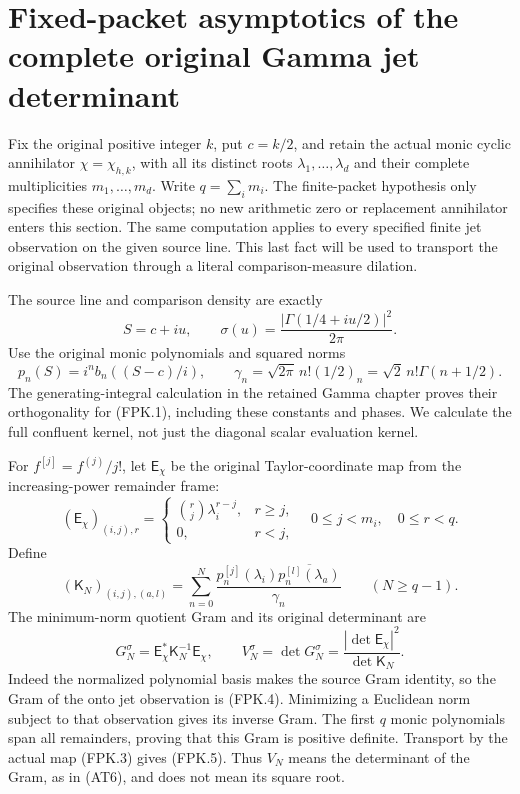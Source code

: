 \section{Fixed-packet asymptotics of the complete original Gamma jet determinant}
\label{sec:fixed-gamma-full-jet}

Fix the original positive integer $k$, put $c=k/2$, and retain the
actual monic cyclic annihilator $\chi=\chi_{h,k}$, with all its
distinct roots $\lambda_1,\ldots,\lambda_d$ and their complete
multiplicities $m_1,\ldots,m_d$. Write $q=\sum_i m_i$.
The finite-packet hypothesis only specifies these original objects;
no new arithmetic zero or replacement annihilator enters this section.
The same computation applies to every specified finite jet observation
on the given source line. This last fact will be used to transport the
original observation through a literal comparison-measure dilation.

The source line and comparison density are exactly
\[
 S=c+iu,\qquad
 \sigma(u)=\frac{|\Gamma(1/4+iu/2)|^2}{2\pi}.
 \tag{FPK.1}
\]
Use the original monic polynomials and squared norms
\[
 p_n(S)=i^n b_n((S-c)/i),\qquad
 \gamma_n=\sqrt{2\pi}\,n!(1/2)_n
          =\sqrt2\,n!\Gamma(n+1/2).
 \tag{FPK.2}
\]
The generating-integral calculation in the retained Gamma chapter proves
their orthogonality for (FPK.1), including these constants and phases.
We calculate the full confluent kernel, not just the diagonal scalar
evaluation kernel.

For $f^{[j]}=f^{(j)}/j!$, let $\mathsf E_\chi$ be the original
Taylor-coordinate map from the increasing-power remainder frame:
\[
 (\mathsf E_\chi)_{(i,j),r}
   =\begin{cases}\binom rj\lambda_i^{r-j},&r\geq j,\\0,&r<j,
     \end{cases}
 \quad 0\leq j<m_i,\quad 0\leq r<q.
 \tag{FPK.3}
\]
Define
\[
 (\mathsf K_N)_{(i,j),(a,l)}
   =\sum_{n=0}^N
      \frac{p_n^{[j]}(\lambda_i)
                   \overline{p_n^{[l]}(\lambda_a)}}{\gamma_n}
       \qquad(N\geq q-1).
 \tag{FPK.4}
\]
The minimum-norm quotient Gram and its original determinant are
\[
 G_N^\sigma=\mathsf E_\chi^*\mathsf K_N^{-1}\mathsf E_\chi,
 \qquad V_N^\sigma=\det G_N^\sigma
         =\frac{|\det\mathsf E_\chi|^2}{\det\mathsf K_N}.
 \tag{FPK.5}
\]
Indeed the normalized polynomial basis makes the source Gram identity,
so the Gram of the onto jet observation is (FPK.4). Minimizing a
Euclidean norm subject to that observation gives its inverse Gram.
The first $q$ monic polynomials span all remainders, proving that this
Gram is positive definite. Transport by the actual map (FPK.3) gives
(FPK.5). Thus $V_N$ means the determinant of the Gram, as in (AT6),
and does not mean its square root.

